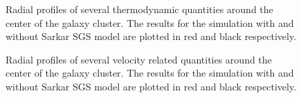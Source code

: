 \begin{figure}[tp]
{\label{fig:poly}}
\caption{Radial profiles of several thermodynamic quantities around the center
of the galaxy cluster. The results for the simulation with and without Sarkar
SGS model are
plotted in red and black respectively.}
\end{figure}
\begin{figure}[tp]
\centering
{}
\caption{Radial profiles of several velocity related quantities around the
center of the galaxy cluster. The results for the simulation with and without
Sarkar SGS model are plotted in red and black respectively.}
\end{figure}

